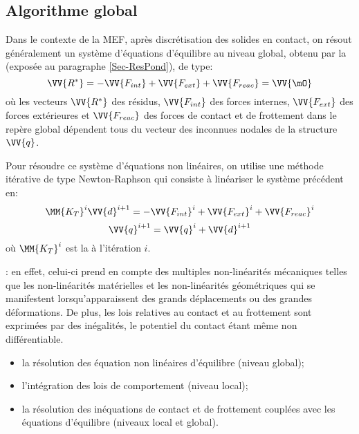 \medskip
\subsection{Algorithme global}

Dans le contexte de la MEF, après discrétisation des solides en contact, on résout généralement 
un système d'équations d'équilibre au niveau global, obtenu par la  (exposée au paragraphe \ref{Sec-ResPond}), de type:
\begin{equation} 
\VV{R^*} = -\VV{F_{int}} + \VV{F_{ext}} + \VV{F_{reac}} = \VV{\mO} 
\end{equation}
où les vecteurs $\VV{R^*}$ des résidus, $\VV{F_{int}}$ des forces internes, $\VV{F_{ext}}$ des forces extérieures
et $\VV{F_{reac}}$ des forces de contact et de frottement dans le repère global dépendent tous du vecteur
des inconnues nodales de la structure $\VV{q}$.

\medskip
Pour résoudre ce système d'équations non linéaires, on utilise une méthode itérative
de type Newton-Raphson 
qui consiste à linéariser le système précédent en:
\begin{equation} \MM{K_T}^i \VV{d}^{i+1} = -\VV{F_{int}}^i + \VV{F_{ext}}^i+\VV{F_{reac}}^i\end{equation}
\begin{equation} \VV{q}^{i+1} = \VV{q}^i+\VV{d}^{i+1} \end{equation}
où $\MM{K_T}^i$ est la  à l'itération $i$.

\medskip
{}: 
en effet, celui-ci prend en compte 
des multiples non-linéarités mécaniques telles que les non-linéarités matérielles et les non-linéarités
géométriques qui se manifestent lorsqu'apparaissent des grands déplacements ou des grandes déformations. 
De plus, les lois relatives au contact et au frottement sont exprimées par des inégalités, le potentiel 
du contact étant même non différentiable. 
\begin{itemize}
   \item la résolution des équation non linéaires d'équilibre (niveau global);
   \item l'intégration des lois de comportement (niveau local);
   \item la résolution des inéquations de contact et de frottement couplées avec les équations 
	d'équilibre (niveaux local et global).
\end{itemize}


\ifVersionAvecExemplesSepares\else
\fi


